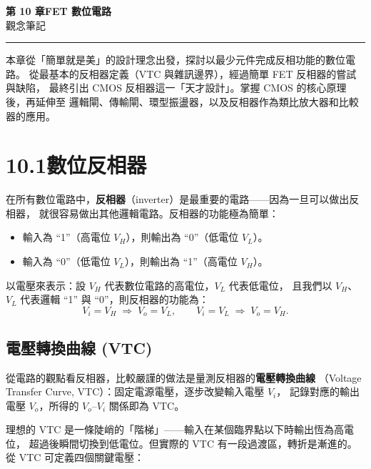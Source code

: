 \documentclass[12pt]{article}
\begin{document}
\begin{center}
{\Huge\bfseries\color{maincol} 第 10 章\quad FET 數位電路}\\[0.4em]
{\large\color{keycol} 觀念筆記}
\end{center}
\vspace{0.5em}
\hrule
\vspace{1em}

本章從「簡單就是美」的設計理念出發，探討以最少元件完成反相功能的數位電路。
從最基本的反相器定義（VTC 與雜訊邊界），經過簡單 FET 反相器的嘗試與缺陷，
最終引出 CMOS 反相器這一「天才設計」。掌握 CMOS 的核心原理後，再延伸至
邏輯閘、傳輸閘、環型振盪器，以及反相器作為類比放大器和比較器的應用。

\section*{10.1\quad 數位反相器}

\begin{keybox}[反相器的核心功能]
在所有數位電路中，\textbf{反相器}（inverter）是最重要的電路——因為一旦可以做出反相器，
就很容易做出其他邏輯電路。反相器的功能極為簡單：
\begin{itemize}[leftmargin=2.2em,itemsep=2pt]
  \item 輸入為 ``1''（高電位 $V_H$），則輸出為 ``0''（低電位 $V_L$）。
  \item 輸入為 ``0''（低電位 $V_L$），則輸出為 ``1''（高電位 $V_H$）。
\end{itemize}
以電壓來表示：設 $V_H$ 代表數位電路的高電位，$V_L$ 代表低電位，
且我們以 $V_H$、$V_L$ 代表邏輯 ``1'' 與 ``0''，則反相器的功能為：
\[
  V_i = V_H \;\Rightarrow\; V_o = V_L, \qquad V_i = V_L \;\Rightarrow\; V_o = V_H.
\]
\end{keybox}

\subsection*{電壓轉換曲線 (VTC)}

從電路的觀點看反相器，比較嚴謹的做法是量測反相器的\textbf{電壓轉換曲線}
（Voltage Transfer Curve, VTC）：固定電源電壓，逐步改變輸入電壓 $V_i$，
記錄對應的輸出電壓 $V_o$，所得的 $V_o$--$V_i$ 關係即為 VTC。

理想的 VTC 是一條陡峭的「階梯」——輸入在某個臨界點以下時輸出恆為高電位，
超過後瞬間切換到低電位。但實際的 VTC 有一段過渡區，轉折是漸進的。
從 VTC 可定義四個關鍵電壓：
\end{document}
